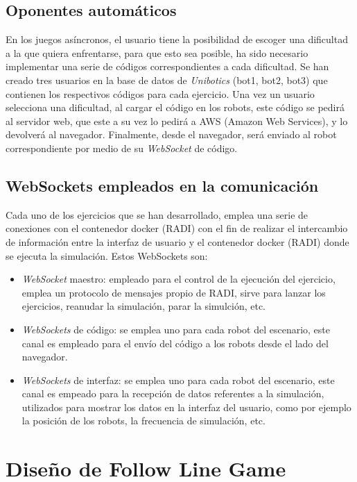 \documentclass[a4paper, 12pt]{book}
\begin{document}
\subsection{Oponentes automáticos}

En los juegos asíncronos, el usuario tiene la posibilidad de escoger una dificultad a la que quiera enfrentarse, para que esto sea posible, ha sido necesario implementar una serie de códigos correspondientes a cada dificultad. Se han creado tres usuarios en la base de datos de \emph{Unibotics} (bot1, bot2, bot3) que contienen los respectivos códigos para cada ejercicio. Una vez un usuario selecciona una dificultad, al cargar el código en los robots, este código se pedirá al servidor web, que este a su vez lo pedirá a AWS (Amazon Web Services), y lo devolverá al navegador. Finalmente, desde el navegador, será enviado al robot correspondiente por medio de su \emph{WebSocket} de código.

\subsection{WebSockets empleados en la comunicación}

Cada uno de los ejercicios que se han desarrollado, emplea una serie de conexiones con el contenedor docker (RADI) con el fin de realizar el intercambio de información entre la interfaz de usuario y el contenedor docker (RADI) donde se ejecuta la simulación. Estos WebSockets son:

\begin{itemize}
\item \emph{WebSocket} maestro: empleado para el control de la ejecución del ejercicio, emplea un protocolo de mensajes propio de RADI, sirve para lanzar los ejercicios, reanudar la simulación, parar la simulción, etc.
\item \emph{WebSockets} de código: se emplea uno para cada robot del escenario, este canal es empleado para el envío del código a los robots desde el lado del navegador.
\item \emph{WebSockets} de interfaz: se emplea uno para cada robot del escenario, este canal es empeado para la recepción de datos referentes a la simulación, utilizados para mostrar los datos en la interfaz del usuario, como por ejemplo la posición de los robots, la frecuencia de simulación, etc.
\end{itemize}

\section{Diseño de Follow Line Game} 
\label{sec:follow_line_game}
\end{document}
